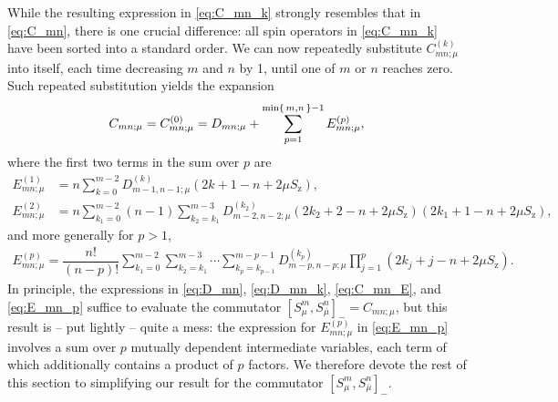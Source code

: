 \documentclass[pra,twocolumn,longbibliography]{revtex4-2}
\newcommand{\f}[2]{\dfrac{#1}{#2}} %
\newcommand{\p}[1]{\left( #1 \right)} %
\renewcommand{\sp}[1]{\left[ #1 \right]} %
\newcommand{\z}{\text{z}}
\newcommand{\bmu}{{\bar\mu}}
\newcommand{\1}{\mathds{1}}
\begin{document}
While the resulting expression in \eqref{eq:C_mn_k} strongly resembles
that in \eqref{eq:C_mn}, there is one crucial difference: all spin
operators in \eqref{eq:C_mn_k} have been sorted into a standard order.
We can now repeatedly substitute $C_{mn;\mu}^{(k)}$ into itself, each
time decreasing $m$ and $n$ by 1, until one of $m$ or $n$ reaches
zero.  Such repeated substitution yields the expansion
\begin{align}
  C_{mn;\mu}
  = C_{mn;\mu}^{(0)}
  = D_{mn;\mu}
  + \sum_{p=1}^{\min\set{m,n}-1} E_{mn;\mu}^{(p)},
  \label{eq:C_mn_E}
\end{align}
where the first two terms in the sum over $p$ are
\begin{align}
  E_{mn;\mu}^{(1)}
  &= n \sum_{k=0}^{m-2} D_{m-1,n-1;\mu}^{(k)} \p{2k+1-n+2\mu S_\z}, \\
  E_{mn;\mu}^{(2)}
  &= n \sum_{k_1=0}^{m-2} \p{n-1} \sum_{k_2=k_1}^{m-3}
  D_{m-2,n-2;\mu}^{(k_2)} \p{2k_2+2-n+2\mu S_\z} \p{2k_1+1-n+2\mu S_\z},
\end{align}
and more generally for $p>1$,
\begin{align}
  E_{mn;\mu}^{(p)}
  = \f{n!}{\p{n-p}!}
  \sum_{k_1=0}^{m-2} \sum_{k_2=k_1}^{m-3} \cdots\sum_{k_p=k_{p-1}}^{m-p-1}
  D_{m-p,n-p;\mu}^{(k_p)} \prod_{j=1}^p \p{2k_j+j-n+2\mu S_\z}.
  \label{eq:E_mn_p}
\end{align}
In principle, the expressions in \eqref{eq:D_mn}, \eqref{eq:D_mn_k},
\eqref{eq:C_mn_E}, and \eqref{eq:E_mn_p} suffice to evaluate the
commutator $\sp{S_\mu^m,S_\bmu^n}_- = C_{mn;\mu}$, but this result is
-- put lightly -- quite a mess: the expression for $E_{mn;\mu}^{(p)}$
in \eqref{eq:E_mn_p} involves a sum over $p$ mutually dependent
intermediate variables, each term of which additionally contains a
product of $p$ factors.  We therefore devote the rest of this section
to simplifying our result for the commutator
$\sp{S_\mu^m,S_\bmu^n}_-$.
\end{document}
